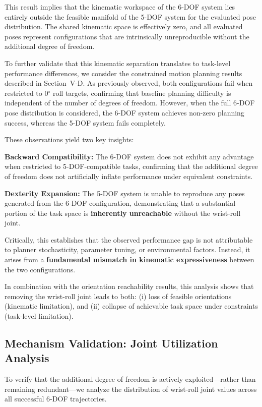 \documentclass[conference]{IEEEtran}
\begin{document}
	This result implies that the kinematic workspace of the 6-DOF system lies entirely outside the feasible manifold of the 5-DOF system for the evaluated pose distribution. The shared kinematic space is effectively zero, and all evaluated poses represent configurations that are intrinsically unreproducible without the additional degree of freedom.
	
	To further validate that this kinematic separation translates to task-level performance differences, we consider the constrained motion planning results described in Section~V-D. As previously observed, both configurations fail when restricted to 0$^\circ$ roll targets, confirming that baseline planning difficulty is independent of the number of degrees of freedom. However, when the full 6-DOF pose distribution is considered, the 6-DOF system achieves non-zero planning success, whereas the 5-DOF system fails completely.
	
	These observations yield two key insights:
	
	\textbf{Backward Compatibility:}  
	The 6-DOF system does not exhibit any advantage when restricted to 5-DOF-compatible tasks, confirming that the additional degree of freedom does not artificially inflate performance under equivalent constraints.
	
	\textbf{Dexterity Expansion:}  
	The 5-DOF system is unable to reproduce any poses generated from the 6-DOF configuration, demonstrating that a substantial portion of the task space is \textbf{inherently unreachable} without the wrist-roll joint.
	
	Critically, this establishes that the observed performance gap is not attributable to planner stochasticity, parameter tuning, or environmental factors. Instead, it arises from a \textbf{fundamental mismatch in kinematic expressiveness} between the two configurations.
	
	In combination with the orientation reachability results, this analysis shows that removing the wrist-roll joint leads to both: (i) loss of feasible orientations (kinematic limitation), and (ii) collapse of achievable task space under constraints (task-level limitation).
	
	\subsection{Mechanism Validation: Joint Utilization Analysis}
	
	To verify that the additional degree of freedom is actively exploited—rather than remaining redundant—we analyze the distribution of wrist-roll joint values across all successful 6-DOF trajectories.
	
\end{document}
